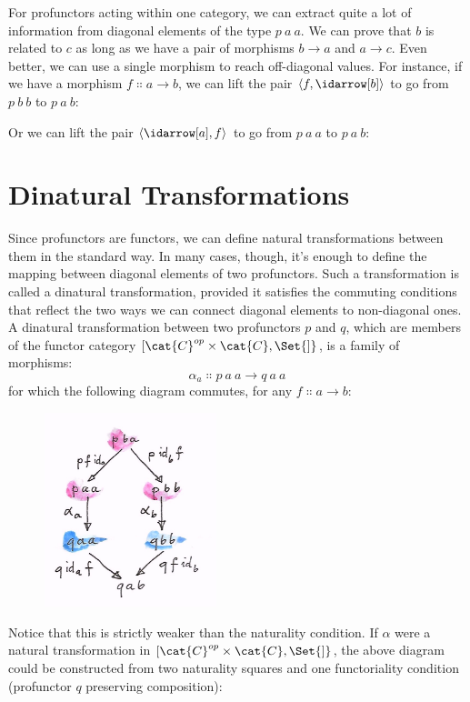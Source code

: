 For profunctors acting within one category, we can extract quite a lot
of information from diagonal elements of the type $p\ a\ a$. We
can prove that $b$ is related to $c$ as long as we have a
pair of morphisms $b \to a$ and
$a \to c$. Even better, we can use a single morphism to
reach off-diagonal values. For instance, if we have a morphism
$f \Colon a \to b$, we can lift the pair
$\langle f, \idarrow[b] \rangle$ to go from $p\ b\ b$ to
$p\ a\ b$:

Or we can lift the pair $\langle \idarrow[a], f \rangle$ to go
from $p\ a\ a$ to $p\ a\ b$:


\section{Dinatural Transformations}

Since profunctors are functors, we can define natural transformations
between them in the standard way. In many cases, though, it's enough to
define the mapping between diagonal elements of two profunctors. Such a
transformation is called a dinatural transformation, provided it
satisfies the commuting conditions that reflect the two ways we can
connect diagonal elements to non-diagonal ones. A dinatural
transformation between two profunctors $p$ and $q$, which
are members of the functor category ${[}\cat{C}^{op}\times{}\cat{C}, \Set{]}$, is a
family of morphisms:
\[\alpha_a \Colon p\ a\ a \to q\ a\ a\]
for which the following diagram commutes, for any $f \Colon a \to b$:

\begin{figure}[H]
\centering
\includegraphics[width=50mm]{images/end.jpg}
\end{figure}

\noindent
Notice that this is strictly weaker than the naturality condition. If
$\alpha$ were a natural transformation in
${[}\cat{C}^{op}\times{}\cat{C}, \Set{]}$, the above diagram could be constructed
from two naturality squares and one functoriality condition (profunctor
$q$ preserving composition):

